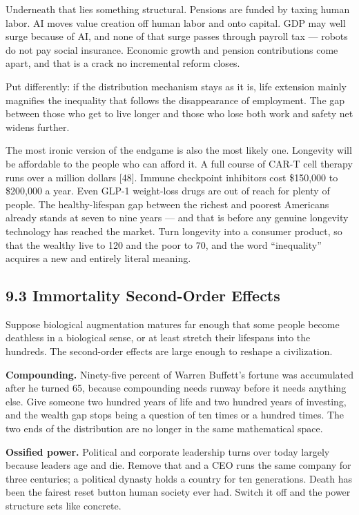 \documentclass[11pt,a4paper]{article}
\begin{document}
Underneath that lies something structural. Pensions are funded by taxing human labor. AI moves value creation off human labor and onto capital. GDP may well surge because of AI, and none of that surge passes through payroll tax --- robots do not pay social insurance. Economic growth and pension contributions come apart, and that is a crack no incremental reform closes.

Put differently: if the distribution mechanism stays as it is, life extension mainly magnifies the inequality that follows the disappearance of employment. The gap between those who get to live longer and those who lose both work and safety net widens further.

The most ironic version of the endgame is also the most likely one. Longevity will be affordable to the people who can afford it. A full course of CAR-T cell therapy runs over a million dollars [48]. Immune checkpoint inhibitors cost \$150,000 to \$200,000 a year. Even GLP-1 weight-loss drugs are out of reach for plenty of people. The healthy-lifespan gap between the richest and poorest Americans already stands at seven to nine years --- and that is before any genuine longevity technology has reached the market. Turn longevity into a consumer product, so that the wealthy live to 120 and the poor to 70, and the word ``inequality'' acquires a new and entirely literal meaning.

\subsection{9.3 Immortality Second-Order Effects}

Suppose biological augmentation matures far enough that some people become deathless in a biological sense, or at least stretch their lifespans into the hundreds. The second-order effects are large enough to reshape a civilization.

\textbf{Compounding.} Ninety-five percent of Warren Buffett's fortune was accumulated after he turned 65, because compounding needs runway before it needs anything else. Give someone two hundred years of life and two hundred years of investing, and the wealth gap stops being a question of ten times or a hundred times. The two ends of the distribution are no longer in the same mathematical space.

\textbf{Ossified power.} Political and corporate leadership turns over today largely because leaders age and die. Remove that and a CEO runs the same company for three centuries; a political dynasty holds a country for ten generations. Death has been the fairest reset button human society ever had. Switch it off and the power structure sets like concrete.
\end{document}
